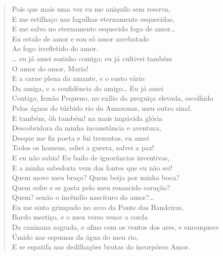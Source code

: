 \begin{verse}
Pois que mais uma vez eu me aniquilo sem reserva,\\
E me estilhaço nas fagulhas eternamente esquecidas,\\
E me salvo no eternamente esquecido fogo de amor\ldots{}\\
Eu estalo de amor e sou só amor arrebatado\\
Ao fogo irrefletido do amor.\\
\ldots{} eu já amei sozinho comigo; eu já cultivei também\\
O amor do amor, Maria!\\
E a carne plena da amante, e o susto vário\\
Da amiga, e a confidência do amigo\ldots{} Eu já amei\\
Contigo, Irmão Pequeno, no exílio da preguiça elevada, escolhido\\
Pelas águas do túrbido rio do Amazonas, meu outro sinal.\\
E também, ôh também! na mais impávida glória\\
Descobridora da minha inconstância e aventura,\\
Desque me fiz poeta e fui trezentos, eu amei\\
Todos os homens, odiei a guerra, salvei a paz!\\
E eu não sabia! Eu bailo de ignorâncias inventivas,\\
E a minha sabedoria vem das fontes que eu não sei!\\
Quem move meu braço? Quem beija por minha boca?\\
Quem sofre e se gasta pelo meu renascido coração?\\
Quem? senão o incêndio nascituro do amor?\ldots{}\\
Eu me sinto grimpado no arco da Ponte das Bandeiras,\\
Bardo mestiço, e o meu verso vence a corda\\
Da caninana sagrada, e afina com os ventos dos ares, e enrouquece\\
Úmido nas espumas da água do meu rio,\\
E se espatifa nas dedilhações brutas do incorpóreo Amor.


\end{verse}
